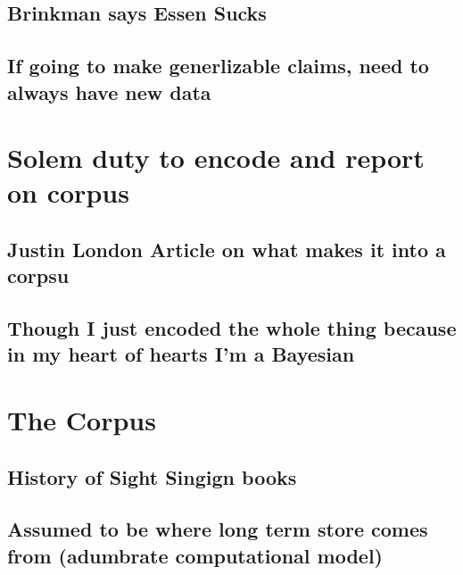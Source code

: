 \documentclass[]{book}
\begin{document}
\hypertarget{brinkman-says-essen-sucks}{%
\subsection{Brinkman says Essen Sucks}\label{brinkman-says-essen-sucks}}

\hypertarget{if-going-to-make-generlizable-claims-need-to-always-have-new-data}{%
\subsection{If going to make generlizable claims, need to always have new data}\label{if-going-to-make-generlizable-claims-need-to-always-have-new-data}}

\hypertarget{solem-duty-to-encode-and-report-on-corpus}{%
\section{Solem duty to encode and report on corpus}\label{solem-duty-to-encode-and-report-on-corpus}}

\hypertarget{justin-london-article-on-what-makes-it-into-a-corpsu}{%
\subsection{Justin London Article on what makes it into a corpsu}\label{justin-london-article-on-what-makes-it-into-a-corpsu}}

\hypertarget{though-i-just-encoded-the-whole-thing-because-in-my-heart-of-hearts-im-a-bayesian}{%
\subsection{Though I just encoded the whole thing because in my heart of hearts I'm a Bayesian}\label{though-i-just-encoded-the-whole-thing-because-in-my-heart-of-hearts-im-a-bayesian}}

\hypertarget{the-corpus}{%
\section{The Corpus}\label{the-corpus}}

\hypertarget{history-of-sight-singign-books}{%
\subsection{History of Sight Singign books}\label{history-of-sight-singign-books}}

\hypertarget{assumed-to-be-where-long-term-store-comes-from-adumbrate-computational-model}{%
\subsection{Assumed to be where long term store comes from (adumbrate computational model)}\label{assumed-to-be-where-long-term-store-comes-from-adumbrate-computational-model}}
\end{document}

